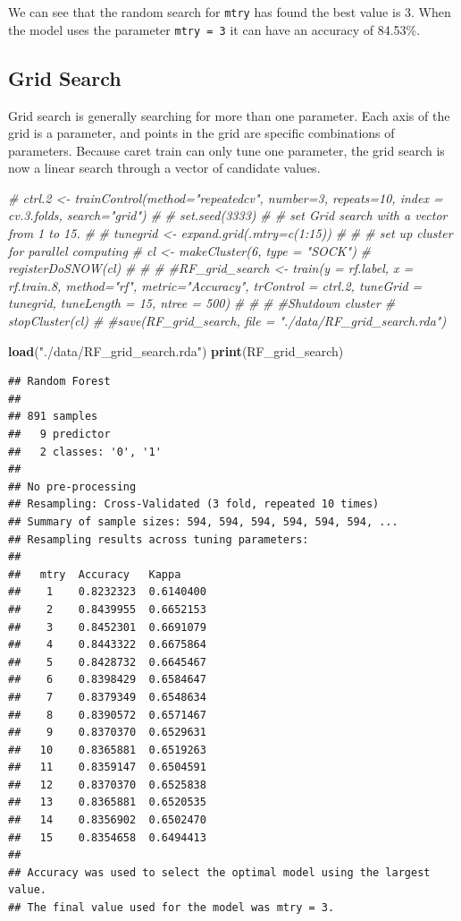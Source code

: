 \documentclass[
]{book}
\newenvironment{Shaded}{\begin{snugshade}}{\end{snugshade}}
\newcommand{\CommentTok}[1]{\textcolor[rgb]{0.56,0.35,0.01}{\textit{#1}}}
\newcommand{\KeywordTok}[1]{\textcolor[rgb]{0.13,0.29,0.53}{\textbf{#1}}}
\newcommand{\NormalTok}[1]{#1}
\newcommand{\StringTok}[1]{\textcolor[rgb]{0.31,0.60,0.02}{#1}}
\begin{document}
We can see that the random search for \texttt{mtry} has found the best value is 3. When the model uses the parameter \texttt{mtry\ =\ 3} it can have an accuracy of 84.53\%.

\hypertarget{grid-search}{%
\subsection*{Grid Search}\label{grid-search}}


Grid search is generally searching for more than one parameter. Each axis of the grid is a parameter, and points in the grid are specific combinations of parameters. Because caret train can only tune one parameter, the grid search is now a linear search through a vector of candidate values.

\begin{Shaded}
\begin{Highlighting}[]
\CommentTok{# ctrl.2 <- trainControl(method="repeatedcv", number=3, repeats=10, index = cv.3.folds, search="grid")}
\CommentTok{# }
\CommentTok{# set.seed(3333)}
\CommentTok{# # set Grid search with a vector from 1 to 15.}
\CommentTok{# }
\CommentTok{# tunegrid <- expand.grid(.mtry=c(1:15))}
\CommentTok{# }
\CommentTok{# # set up cluster for parallel computing}
\CommentTok{# cl <- makeCluster(6, type = "SOCK")}
\CommentTok{# registerDoSNOW(cl)}
\CommentTok{# }
\CommentTok{# }
\CommentTok{# #RF_grid_search <- train(y = rf.label, x = rf.train.8,  method="rf", metric="Accuracy", trControl = ctrl.2, tuneGrid = tunegrid, tuneLength = 15, ntree = 500)}
\CommentTok{# }
\CommentTok{# }
\CommentTok{# #Shutdown cluster}
\CommentTok{# stopCluster(cl)}
\CommentTok{# #save(RF_grid_search, file = "./data/RF_grid_search.rda")}

\KeywordTok{load}\NormalTok{(}\StringTok{"./data/RF_grid_search.rda"}\NormalTok{)}
\KeywordTok{print}\NormalTok{(RF_grid_search)}
\end{Highlighting}
\end{Shaded}

\begin{verbatim}
## Random Forest 
## 
## 891 samples
##   9 predictor
##   2 classes: '0', '1' 
## 
## No pre-processing
## Resampling: Cross-Validated (3 fold, repeated 10 times) 
## Summary of sample sizes: 594, 594, 594, 594, 594, 594, ... 
## Resampling results across tuning parameters:
## 
##   mtry  Accuracy   Kappa    
##    1    0.8232323  0.6140400
##    2    0.8439955  0.6652153
##    3    0.8452301  0.6691079
##    4    0.8443322  0.6675864
##    5    0.8428732  0.6645467
##    6    0.8398429  0.6584647
##    7    0.8379349  0.6548634
##    8    0.8390572  0.6571467
##    9    0.8370370  0.6529631
##   10    0.8365881  0.6519263
##   11    0.8359147  0.6504591
##   12    0.8370370  0.6525838
##   13    0.8365881  0.6520535
##   14    0.8356902  0.6502470
##   15    0.8354658  0.6494413
## 
## Accuracy was used to select the optimal model using the largest value.
## The final value used for the model was mtry = 3.
\end{verbatim}
\end{document}

